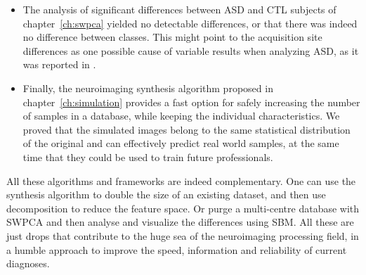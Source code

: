 \begin{itemize}
	\item The analysis of significant differences between \ac{ASD} and \ac{CTL} subjects of chapter~\ref{ch:swpca} yielded no detectable differences, or that there was indeed no difference between classes. This might point to the acquisition site differences as one possible cause of variable results when analyzing \ac{ASD}, as it was reported in \cite{haar2014anatomical}. 
	\item Finally, the neuroimaging synthesis algorithm proposed in chapter~\ref{ch:simulation} provides a fast option for safely increasing the number of samples in a database, while keeping the individual characteristics. We proved that the simulated images belong to the same statistical distribution of the original and can effectively predict real world samples, at the same time that they could be used to train future professionals. 
\end{itemize}

All these algorithms and frameworks are indeed complementary. One can use the synthesis algorithm to double the size of an existing dataset, and then use decomposition to reduce the feature space. Or purge a multi-centre database with \ac{SWPCA} and then analyse and visualize the differences using \ac{SBM}. All these are just drops that contribute to the huge sea of the neuroimaging processing field, in a humble approach to improve the speed, information and reliability of current diagnoses.



